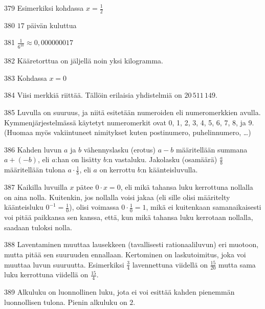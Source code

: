 \begin{Vastaus}{379}
Esimerkiksi kohdassa $x = \frac{1}{2}$
	
\end{Vastaus}
\begin{Vastaus}{380}
$17$ päivän kuluttua
\end{Vastaus}
\begin{Vastaus}{381}
$ \frac{1}{6^{10}}\approx0,000000017$
\end{Vastaus}
\begin{Vastaus}{382}
Kääretorttua on jäljellä noin yksi kilogramma.
\end{Vastaus}
\begin{Vastaus}{383}
Kohdassa $x=0$
\end{Vastaus}
\begin{Vastaus}{384}
Viisi merkkiä riittää. Tällöin erilaisia yhdistelmiä on $20\,511\,149$.
\end{Vastaus}
\begin{Vastaus}{385}
Luvulla on suuruus, ja niitä esitetään numeroiden eli numeromerkkien avulla. Kymmenjärjestelmässä käytetyt numeromerkit ovat 0, 1, 2, 3, 4, 5, 6, 7, 8, ja 9. (Huomaa myös vakiintuneet nimitykset kuten postinumero, puhelinnumero, \ldots)
\end{Vastaus}
\begin{Vastaus}{386}
Kahden luvun $a$ ja $b$ vähennyslasku (erotus) $a-b$ määritellään summana $a+(-b)$, eli $a$:han on lisätty $b$:n vastaluku. Jakolasku (osamäärä) $\frac{a}{b}$ määritellään tulona $a\cdot \frac1b$, eli $a$ on kerrottu $b$:n käänteisluvulla.
\end{Vastaus}
\begin{Vastaus}{387}
Kaikilla luvuilla $x$ pätee $0 \cdot x = 0$, eli mikä tahansa luku kerrottuna nollalla on aina nolla. Kuitenkin, jos nollalla voisi jakaa (eli sille olisi määritelty käänteisluku $0^{-1}=\frac10$), olisi voimassa $0 \cdot\frac10 = 1$, mikä ei kuitenkaan samanaikaisesti voi pitää paikkansa sen kanssa, että, kun mikä tahansa luku kerrotaan nollalla, saadaan tuloksi nolla.
\end{Vastaus}
\begin{Vastaus}{388}
Laventaminen muuttaa lausekkeen (tavallisesti rationaaliluvun) eri muotoon, mutta pitää sen suuruuden ennallaan. Kertominen on laskutoimitus, joka voi muuttaa luvun suuruutta. Esimerkiksi $\frac34$ lavennettuna viidellä on $\frac{15}{20}$ mutta sama luku kerrottuna viidellä on $\frac{15}{4}$.
\end{Vastaus}
\begin{Vastaus}{389}
Alkuluku on luonnollinen luku, jota ei voi esittää kahden pienemmän luonnollisen tulona. Pienin alkuluku on $2$. %
\end{Vastaus}
